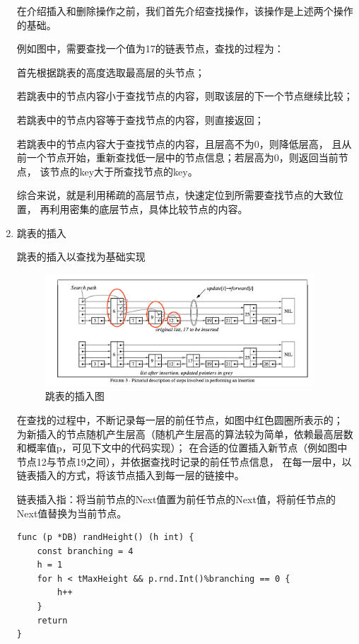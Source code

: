 \begin{enumerate}
		在介绍插入和删除操作之前，我们首先介绍查找操作，该操作是上述两个操作的基础。

例如图中，需要查找一个值为17的链表节点，查找的过程为：

首先根据跳表的高度选取最高层的头节点；

若跳表中的节点内容小于查找节点的内容，则取该层的下一个节点继续比较；

若跳表中的节点内容等于查找节点的内容，则直接返回；

若跳表中的节点内容大于查找节点的内容，且层高不为0，则降低层高，
且从前一个节点开始，重新查找低一层中的节点信息；若层高为0，则返回当前节点，
该节点的key大于所查找节点的key。

综合来说，就是利用稀疏的高层节点，快速定位到所需要查找节点的大致位置，
再利用密集的底层节点，具体比较节点的内容。
		

		\item 跳表的插入
		
		跳表的插入以查找为基础实现

		\begin{figure}[H]
			\centering
			\includegraphics[width=0.95\textwidth]{images/skiplist_insert}
			\caption{跳表的插入图}
			\label{skiplist_insert}
		\end{figure}

		在查找的过程中，不断记录每一层的前任节点，如图中红色圆圈所表示的；
		为新插入的节点随机产生层高（随机产生层高的算法较为简单，依赖最高层数和概率值p，可见下文中的代码实现）；
		在合适的位置插入新节点（例如图中节点12与节点19之间），并依据查找时记录的前任节点信息，
		在每一层中，以链表插入的方式，将该节点插入到每一层的链接中。


		链表插入指：将当前节点的Next值置为前任节点的Next值，将前任节点的Next值替换为当前节点。

		\begin{lstlisting}[caption=skiplistRandHeight , label=code_radds_storage_skiplist_randHeight]
func (p *DB) randHeight() (h int) {
	const branching = 4
	h = 1
	for h < tMaxHeight && p.rnd.Int()%branching == 0 {
		h++
	}
	return
}	
		\end{lstlisting}


\end{enumerate}
